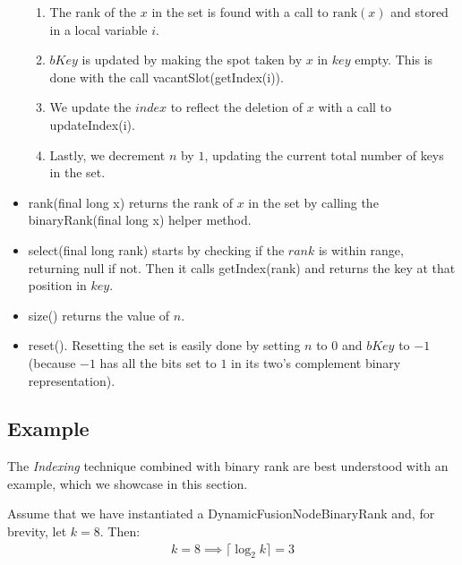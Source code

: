 \begin{itemize}
\begin{enumerate}
        \item
        The rank of the $x$ in the set is found with a call to $\text{rank}(x)$ and stored in a local variable $i$.
        
        \item
        $bKey$ is updated by making the spot taken by $x$ in $key$ empty. This is done with the call {\ttfamily vacantSlot(getIndex(i))}.
        
        \item
        We update the $index$ to reflect the deletion of $x$ with a call to {\ttfamily updateIndex(i)}.
        
        \item
        Lastly, we decrement $n$ by $1$, updating the current total number of keys in the set.
    \end{enumerate}
    
    \item
    {\ttfamily rank(final long x)} returns the rank of $x$ in the set by calling the {\ttfamily binaryRank(final long x)} helper method.
    
    \item
    {\ttfamily select(final long rank)} starts by checking if the $rank$ is within range, returning {\ttfamily null} if not. Then it calls {\ttfamily getIndex(rank)} and returns the key at that position in $key$.
    
    \item
    {\ttfamily size()} returns the value of $n$.
    
    \item
    {\ttfamily reset()}.
    Resetting the set is easily done by setting $n$ to $0$ and $bKey$ to $-1$ (because $-1$ has all the bits set to $1$ in its two's complement binary representation).
\end{itemize}

\subsection{Example}

The \textit{Indexing} technique combined with binary rank are best understood with an example, which we showcase in this section.


Assume that we have instantiated a {\ttfamily DynamicFusionNodeBinaryRank} and, for brevity, let $k = 8$. Then:
\begin{align*}
    k = 8 \implies \lceil \log_2 k \rceil = 3
\end{align*}

